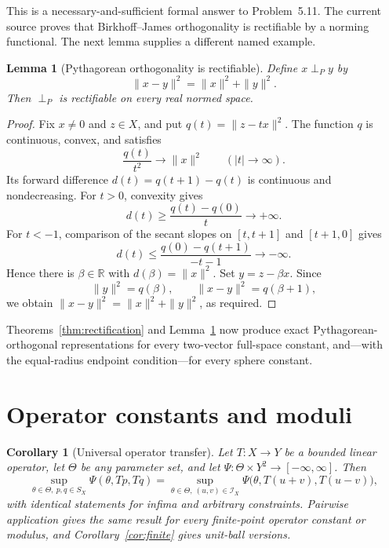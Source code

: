 \documentclass[11pt]{article}
\newtheorem{corollary}{Corollary}
\newtheorem{lemma}{Lemma}
\newcommand{\R}{\mathbb R}
\newcommand{\SX}{S_X}
\newcommand{\perpP}{\mathrel{\perp_P}}
\begin{document}
This is a necessary-and-sufficient formal answer to Problem~5.11.  The current
source proves that Birkhoff--James orthogonality is rectifiable by a norming
functional.  The next lemma supplies a different named example.

\begin{lemma}[Pythagorean orthogonality is rectifiable]\label{lem:pythagorean}
Define $x\perpP y$ by
\[
 \|x-y\|^2=\|x\|^2+\|y\|^2.
\]
Then $\perp_P$ is rectifiable on every real normed space.
\end{lemma}

\begin{proof}
Fix $x\ne0$ and $z\in X$, and put $q(t)=\|z-tx\|^2$.  The function $q$ is
continuous, convex, and satisfies
\[
 \frac{q(t)}{t^2}\longrightarrow\|x\|^2\qquad(|t|\to\infty).
\]
Its forward difference $d(t)=q(t+1)-q(t)$ is continuous and nondecreasing.
For $t>0$, convexity gives
\[
 d(t)\geq\frac{q(t)-q(0)}{t}\longrightarrow+\infty.
\]
For $t<-1$, comparison of the secant slopes on $[t,t+1]$ and $[t+1,0]$
gives
\[
 d(t)\leq\frac{q(0)-q(t+1)}{-t-1}\longrightarrow-\infty.
\]
Hence there is $\beta\in\R$ with $d(\beta)=\|x\|^2$.  Set
$y=z-\beta x$.  Since
\[
 \|y\|^2=q(\beta),\qquad \|x-y\|^2=q(\beta+1),
\]
we obtain $\|x-y\|^2=\|x\|^2+\|y\|^2$, as required.
\end{proof}

Theorems~\ref{thm:rectification} and Lemma~\ref{lem:pythagorean} now produce
exact Pythagorean-orthogonal representations for every two-vector full-space
constant, and—with the equal-radius endpoint condition—for every sphere
constant.

\section{Operator constants and moduli}

\begin{corollary}[Universal operator transfer]\label{cor:operator}
Let $T:X\to Y$ be a bounded linear operator, let $\Theta$ be any parameter
set, and let $\Psi:\Theta\times Y^2\to[-\infty,\infty]$.  Then
\[
 \sup_{\theta\in\Theta,\ p,q\in\SX}\Psi(\theta,Tp,Tq)
 =\sup_{\theta\in\Theta,\ (u,v)\in\mathcal I_X}
 \Psi\bigl(\theta,T(u+v),T(u-v)\bigr),
\]
with identical statements for infima and arbitrary constraints.  Pairwise
application gives the same result for every finite-point operator constant or
modulus, and Corollary~\ref{cor:finite} gives unit-ball versions.
\end{corollary}
\end{document}
